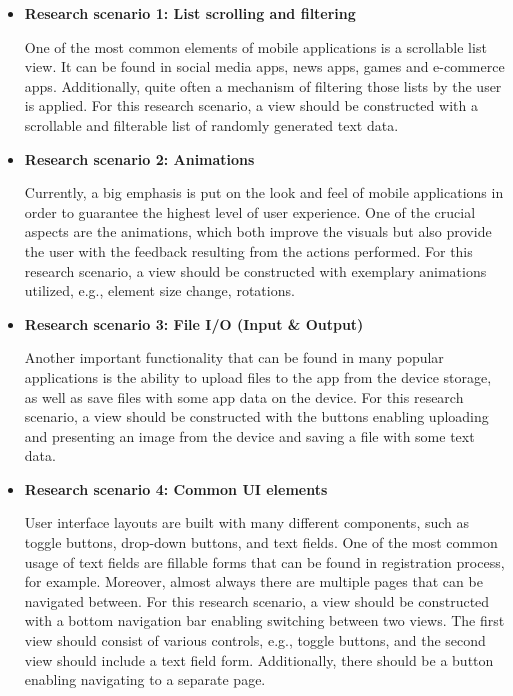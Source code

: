 \begin{itemize}
    \item \textbf{Research scenario 1: List scrolling and filtering}
        
    One of the most common elements of mobile applications is a scrollable list view. It can be found in social media apps, news apps, games and e-commerce apps. Additionally, quite often a mechanism of filtering those lists by the user is applied. For this research scenario, a view should be constructed with a scrollable and filterable list of randomly generated text data.

    \bigskip

    \item \textbf{Research scenario 2: Animations}
    
    Currently, a big emphasis is put on the look and feel of mobile applications in order to guarantee the highest level of user experience. One of the crucial aspects are the animations, which both improve the visuals but also provide the user with the feedback resulting from the actions performed. For this research scenario, a view should be constructed with exemplary animations utilized, e.g., element size change, rotations.

    \bigskip

    \item \textbf{Research scenario 3: File I/O (Input \& Output)}
    
    Another important functionality that can be found in many popular applications is the ability to upload files to the app from the device storage, as well as save files with some app data on the device. For this research scenario, a view should be constructed with the buttons enabling uploading and presenting an image from the device and saving a file with some text data.

    \bigskip

    \item \textbf{Research scenario 4: Common UI elements}
    
    User interface layouts are built with many different components, such as toggle buttons, drop-down buttons, and text fields. One of the most common usage of text fields are fillable forms that can be found in registration process, for example. Moreover, almost always there are multiple pages that can be navigated between. For this research scenario, a view should be constructed with a bottom navigation bar enabling switching between two views. The first view should consist of various controls, e.g., toggle buttons, and the second view should include a text field form. Additionally, there should be a button enabling navigating to a separate page.

\end{itemize}

